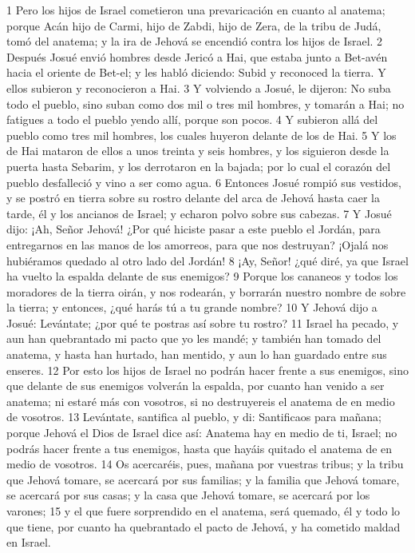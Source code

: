 1 Pero los hijos de Israel cometieron una prevaricación en cuanto al anatema; porque Acán hijo de Carmi, hijo de Zabdi, hijo de Zera, de la tribu de Judá, tomó del anatema; y la ira de Jehová se encendió contra los hijos de Israel.
2 Después Josué envió hombres desde Jericó a Hai, que estaba junto a Bet-avén hacia el oriente de Bet-el; y les habló diciendo: Subid y reconoced la tierra. Y ellos subieron y reconocieron a Hai.
3 Y volviendo a Josué, le dijeron: No suba todo el pueblo, sino suban como dos mil o tres mil hombres, y tomarán a Hai; no fatigues a todo el pueblo yendo allí, porque son pocos.
4 Y subieron allá del pueblo como tres mil hombres, los cuales huyeron delante de los de Hai.
5 Y los de Hai mataron de ellos a unos treinta y seis hombres, y los siguieron desde la puerta hasta Sebarim, y los derrotaron en la bajada; por lo cual el corazón del pueblo desfalleció y vino a ser como agua.
6 Entonces Josué rompió sus vestidos, y se postró en tierra sobre su rostro delante del arca de Jehová hasta caer la tarde, él y los ancianos de Israel; y echaron polvo sobre sus cabezas.
7 Y Josué dijo: ¡Ah, Señor Jehová! ¿Por qué hiciste pasar a este pueblo el Jordán, para entregarnos en las manos de los amorreos, para que nos destruyan? ¡Ojalá nos hubiéramos quedado al otro lado del Jordán!
8 ¡Ay, Señor! ¿qué diré, ya que Israel ha vuelto la espalda delante de sus enemigos?
9 Porque los cananeos y todos los moradores de la tierra oirán, y nos rodearán, y borrarán nuestro nombre de sobre la tierra; y entonces, ¿qué harás tú a tu grande nombre?
10 Y Jehová dijo a Josué: Levántate; ¿por qué te postras así sobre tu rostro?
11 Israel ha pecado, y aun han quebrantado mi pacto que yo les mandé; y también han tomado del anatema, y hasta han hurtado, han mentido, y aun lo han guardado entre sus enseres.
12 Por esto los hijos de Israel no podrán hacer frente a sus enemigos, sino que delante de sus enemigos volverán la espalda, por cuanto han venido a ser anatema; ni estaré más con vosotros, si no destruyereis el anatema de en medio de vosotros.
13 Levántate, santifica al pueblo, y di: Santificaos para mañana; porque Jehová el Dios de Israel dice así: Anatema hay en medio de ti, Israel; no podrás hacer frente a tus enemigos, hasta que hayáis quitado el anatema de en medio de vosotros.
14 Os acercaréis, pues, mañana por vuestras tribus; y la tribu que Jehová tomare, se acercará por sus familias; y la familia que Jehová tomare, se acercará por sus casas; y la casa que Jehová tomare, se acercará por los varones;
15 y el que fuere sorprendido en el anatema, será quemado, él y todo lo que tiene, por cuanto ha quebrantado el pacto de Jehová, y ha cometido maldad en Israel.
